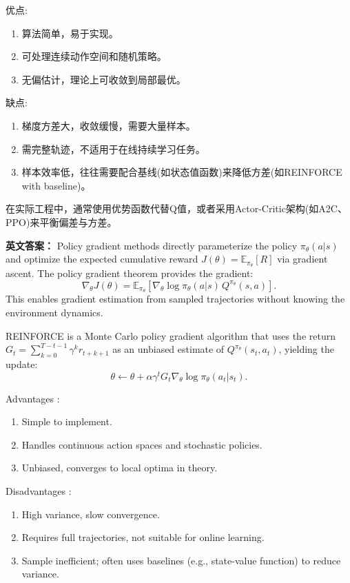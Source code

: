 \documentclass[10pt,a4paper]{ctexart}
\begin{document}
 优点:
\begin{enumerate}
    \item 算法简单，易于实现。
    \item 可处理连续动作空间和随机策略。
    \item 无偏估计，理论上可收敛到局部最优。
\end{enumerate}

 缺点:
\begin{enumerate}
    \item 梯度方差大，收敛缓慢，需要大量样本。
    \item 需完整轨迹，不适用于在线持续学习任务。
    \item 样本效率低，往往需要配合基线(如状态值函数)来降低方差(如REINFORCE with baseline)。
\end{enumerate}

在实际工程中，通常使用优势函数代替Q值，或者采用Actor-Critic架构(如A2C、PPO)来平衡偏差与方差。

\textbf{英文答案：}  
Policy gradient methods directly parameterize the policy \(\pi_\theta(a|s)\) and optimize the expected cumulative reward \(J(\theta)=\mathbb{E}_{\pi_\theta}[R]\) via gradient ascent. The policy gradient theorem provides the gradient:
\[
\nabla_\theta J(\theta) = \mathbb{E}_{\pi_\theta} \left[ \nabla_\theta \log \pi_\theta(a|s) \, Q^{\pi_\theta}(s,a) \right].
\]  
This enables gradient estimation from sampled trajectories without knowing the environment dynamics.

 REINFORCE  is a Monte Carlo policy gradient algorithm that uses the return \(G_t = \sum_{k=0}^{T-t-1} \gamma^k r_{t+k+1}\) as an unbiased estimate of \(Q^{\pi_\theta}(s_t,a_t)\), yielding the update:
\[
\theta \leftarrow \theta + \alpha \gamma^t G_t \nabla_\theta \log \pi_\theta(a_t|s_t).
\]

 Advantages :
\begin{enumerate}
    \item Simple to implement.
    \item Handles continuous action spaces and stochastic policies.
    \item Unbiased, converges to local optima in theory.
\end{enumerate}

 Disadvantages :
\begin{enumerate}
    \item High variance, slow convergence.
    \item Requires full trajectories, not suitable for online learning.
    \item Sample inefficient; often uses baselines (e.g., state-value function) to reduce variance.
\end{enumerate}
\end{document}
